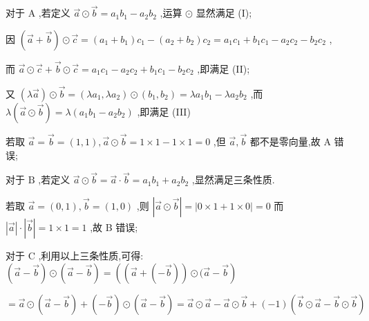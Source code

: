 \documentclass[10pt]{article}
\begin{document}
对于 \(\mathrm{A}\) ,若定义 \(\overrightarrow{a} \odot  \overrightarrow{b} = {a}_{1}{b}_{1} - {a}_{2}{b}_{2}\) ,运算 \(\odot\) 显然满足 (I);

因 \(\left( {\overrightarrow{a} + \overrightarrow{b}}\right)  \odot  \overrightarrow{c} = \left( {{a}_{1} + {b}_{1}}\right) {c}_{1} - \left( {{a}_{2} + {b}_{2}}\right) {c}_{2} = {a}_{1}{c}_{1} + {b}_{1}{c}_{1} - {a}_{2}{c}_{2} - {b}_{2}{c}_{2}\) ,

而 \(\overrightarrow{a} \odot  \overrightarrow{c} + \overrightarrow{b} \odot  \overrightarrow{c} = {a}_{1}{c}_{1} - {a}_{2}{c}_{2} + {b}_{1}{c}_{1} - {b}_{2}{c}_{2}\) ,即满足 (II);

又 \(\left( {\lambda \overrightarrow{a}}\right)  \odot  \overrightarrow{b} = \left( {\lambda {a}_{1},\lambda {a}_{2}}\right)  \odot  \left( {{b}_{1},{b}_{2}}\right)  = \lambda {a}_{1}{b}_{1} - \lambda {a}_{2}{b}_{2}\) ,而 \(\lambda \left( {\overrightarrow{a} \odot  \overrightarrow{b}}\right)  = \lambda \left( {{a}_{1}{b}_{1} - {a}_{2}{b}_{2}}\right)\) ,即满足 (III)

若取 \(\overrightarrow{a} = \overrightarrow{b} = \left( {1,1}\right) ,\overrightarrow{a} \odot  \overrightarrow{b} = 1 \times  1 - 1 \times  1 = 0\) ,但 \(\overrightarrow{a},\overrightarrow{b}\) 都不是零向量,故 \(\mathrm{A}\) 错误;

对于 \(\mathrm{B}\) ,若定义 \(\overrightarrow{a} \odot  \overrightarrow{b} = \overrightarrow{a} \cdot  \overrightarrow{b} = {a}_{1}{b}_{1} + {a}_{2}{b}_{2}\) ,显然满足三条性质.

若取 \(\overrightarrow{a} = \left( {0,1}\right) ,\overrightarrow{b} = \left( {1,0}\right)\) ,则 \(\left| {\overrightarrow{a} \odot  \overrightarrow{b}}\right|  = \left| {0 \times  1 + 1 \times  0}\right|  = 0\) 而 \(\left| \overrightarrow{a}\right|  \cdot  \left| \overrightarrow{b}\right|  = 1 \times  1 = 1\) ,故 B 错误;

对于 \(\mathrm{C}\) ,利用以上三条性质,可得: \(\left( {\overrightarrow{a} - \overrightarrow{b}}\right)  \odot  \left( {\overrightarrow{a} - \overrightarrow{b}}\right)  = \left( {\left( {\overrightarrow{a} + \left( {-\overrightarrow{b}}\right) }\right)  \odot  (\overrightarrow{a} - \overrightarrow{b}}\right)\)

\(= \overrightarrow{a} \odot  \left( {\overrightarrow{a} - \overrightarrow{b}}\right)  + \left( {-\overrightarrow{b}}\right)  \odot  \left( {\overrightarrow{a} - \overrightarrow{b}}\right)  = \overrightarrow{a} \odot  \overrightarrow{a} - \overrightarrow{a} \odot  \overrightarrow{b} + \left( {-1}\right) \left( {\overrightarrow{b} \odot  \overrightarrow{a} - \overrightarrow{b} \odot  \overrightarrow{b}}\right)\)
\end{document}
